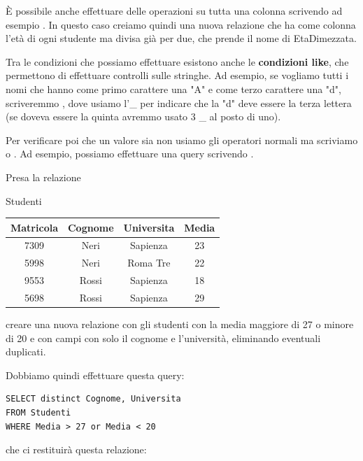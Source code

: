 \documentclass[11pt, a4paper, titlepage, oneside]{scrbook}
\begin{document}
È possibile anche effettuare delle operazioni su tutta una colonna scrivendo ad esempio . In questo caso creiamo quindi una nuova relazione che ha come colonna l'età di ogni studente ma divisa già per due, che prende il nome di EtaDimezzata. 

Tra le condizioni che possiamo effettuare esistono anche le \textbf{condizioni like}, che permettono di effettuare controlli sulle stringhe. Ad esempio, se vogliamo tutti i nomi che hanno come primo carattere una "A" e come terzo carattere una "d", scriveremmo , dove usiamo l'\_ per indicare che la "d" deve essere la terza lettera (se doveva essere la quinta avremmo usato 3 \_ al posto di uno).

Per verificare poi che un valore sia  non usiamo gli operatori normali ma scriviamo  o . Ad esempio, possiamo effettuare una query scrivendo .

\Esempio \nopagebreak

Presa la relazione \nopagebreak

\begin{center}
  Studenti \nopagebreak


  \begin{tabular}{|c|c|c|c|}
    \hline
    \textbf{Matricola} & \textbf{Cognome} & \textbf{Universita} & \textbf{Media} \\
    \hline
    7309 & Neri  & Sapienza    & 23 \\
    5998 & Neri  & Roma Tre    & 22 \\
    9553 & Rossi & Sapienza    & 18 \\
    5698 & Rossi & Sapienza & 29 \\
    \hline
  \end{tabular}
\end{center}

creare una nuova relazione con gli studenti con la media maggiore di 27 o  minore di 20 e con campi con solo il cognome e l'università, eliminando eventuali duplicati. 

Dobbiamo quindi effettuare questa query:

\begin{lstlisting}
SELECT distinct Cognome, Universita
FROM Studenti
WHERE Media > 27 or Media < 20
\end{lstlisting}

che ci restituirà questa relazione:
\end{document}
